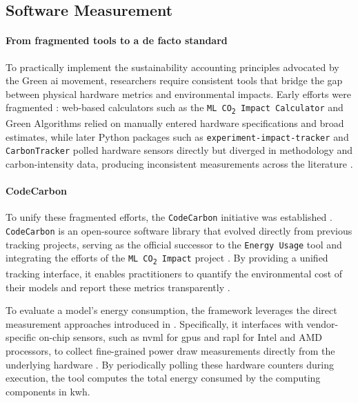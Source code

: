 \subsection{Software Measurement}
\label{sec:theoretical_codecarbon}

\paragraph{From fragmented tools to a de facto standard} To practically implement the sustainability accounting principles advocated by the Green \gls{ai} movement, researchers require consistent tools that bridge the gap between physical hardware metrics and environmental impacts. Early efforts were fragmented \parencite{bannourEvaluatingCarbonFootprint2021}: web-based calculators such as the \texttt{ML CO\textsubscript{2} Impact Calculator} \parencite{lacosteQuantifyingCarbonEmissions2019} and Green Algorithms \parencite{lannelongueGreenAlgorithmsQuantifying2021} relied on manually entered hardware specifications and broad estimates, while later Python packages such as \texttt{experiment-impact-tracker} \parencite{hendersonSystematicReportingEnergy2020} and \texttt{CarbonTracker} \parencite{anthonyCarbontrackerTrackingPredicting2020} polled hardware sensors directly but diverged in methodology and carbon-intensity data, producing inconsistent measurements across the literature \parencite{bannourEvaluatingCarbonFootprint2021}.

\paragraph{CodeCarbon} To unify these fragmented efforts, the \texttt{CodeCarbon} \parencite{courtyMlco2CodecarbonV2412024} initiative was established \parencite{bannourEvaluatingCarbonFootprint2021}. \texttt{CodeCarbon} is an open-source software library that evolved directly from previous tracking projects, serving as the official successor to the \texttt{Energy Usage} tool \parencite{rodriguezEvaluatingEnergyConsumption2024} and integrating the efforts of the \texttt{ML CO\textsubscript{2} Impact} project \parencite{bannourEvaluatingCarbonFootprint2021}. By providing a unified tracking interface, it enables practitioners to quantify the environmental cost of their models and report these metrics transparently \parencite{courtyMlco2CodecarbonV2412024}.

To evaluate a model's energy consumption, the framework leverages the direct measurement approaches introduced in . Specifically, it interfaces with vendor-specific on-chip sensors, such as \gls{nvml} for \glspl{gpu} and \gls{rapl} for Intel and AMD processors, to collect fine-grained power draw measurements directly from the underlying hardware \parencite{rodriguezEvaluatingEnergyConsumption2024}. By periodically polling these hardware counters during execution, the tool computes the total energy consumed by the computing components in \gls{kwh}.

